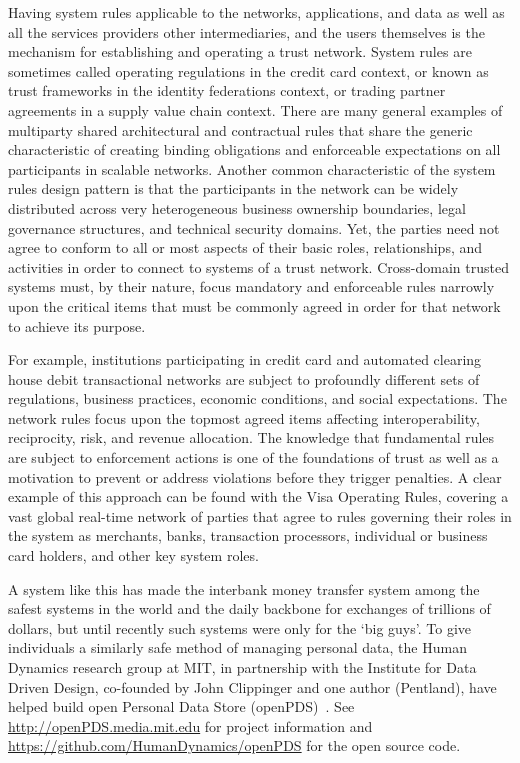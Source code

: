 Having system rules applicable to the networks, applications, and data as well as all the services providers other intermediaries, and the users themselves is the mechanism for establishing and operating a trust network.
System rules are sometimes called operating regulations in the credit card context, or known as trust frameworks in the identity federations context, or trading partner agreements in a supply value chain context.
There are many general examples of multiparty shared architectural and contractual rules that share the generic characteristic of creating binding obligations and enforceable expectations on all participants in scalable networks.
Another common characteristic of the system rules design pattern is that the participants in the network can be widely distributed across very heterogeneous business ownership boundaries, legal governance structures, and technical security domains.
Yet, the parties need not agree to conform to all or most aspects of their basic roles, relationships, and activities in order to connect to systems of a trust network.
Cross-domain trusted systems must, by their nature, focus mandatory and enforceable rules narrowly upon the critical items that must be commonly agreed in order for that network to achieve its purpose.

For example, institutions participating in credit card and automated clearing house debit transactional networks are subject to profoundly different sets of regulations, business practices, economic conditions, and social expectations.
The network rules focus upon the topmost agreed items affecting interoperability, reciprocity, risk, and revenue allocation.
The knowledge that fundamental rules are subject to enforcement actions is one of the foundations of trust as well as a motivation to prevent or address violations before they trigger penalties. 
A clear example of this approach can be found with the Visa Operating Rules, covering a vast global real-time network of parties that agree to rules governing their roles in the system as merchants, banks, transaction processors, individual or business card holders, and other key system roles.

A system like this has made the interbank money transfer system among the safest systems in the world and the daily backbone for exchanges of trillions of dollars, but until recently such systems were only for the `big guys'.
To give individuals a similarly safe method of managing personal data, the Human Dynamics research group at MIT, in partnership with the Institute for Data Driven Design, co-founded by John Clippinger and one author (Pentland), have helped build open Personal Data Store (openPDS)~\cite{de2012trusted}. See \url{http://openPDS.media.mit.edu} for project information and \url{https://github.com/HumanDynamics/openPDS} for the open source code.

